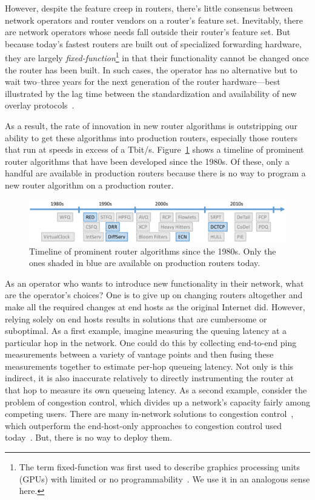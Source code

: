 However, despite the feature creep in routers, there's little consensus between
network operators and router vendors on a router's feature set. Inevitably,
there are network operators whose needs fall outside their router's feature
set. But because today's fastest routers are built out of specialized
forwarding hardware, they are largely {\em fixed-function}\footnote{The term fixed-function
was first used to describe graphics processing units (GPUs) with limited or no programmability~\cite{gpu_fixed}. We use it in an analogous sense here.} in that their
functionality cannot be changed once the router has been built. In such cases,
the operator has no alternative but to wait two--three years for the next
generation of the router hardware---best illustrated by the lag time between
the standardization and availability of new overlay protocols~\cite{vxlan,
nvgre}.

As a result, the rate of innovation in new router algorithms is outstripping
our ability to get these algorithms into production routers, especially those
routers that run at speeds in excess of a Tbit/s.
Figure~\ref{fig:router_algos} shows a timeline of prominent router algorithms
that have been developed since the 1980s. Of these, only a handful are
available in production routers because there is no way to program a new router
algorithm on a production router.

\begin{figure}
\centering
\includegraphics[width=\columnwidth]{router_alg_timeline.pdf}
\caption{Timeline of prominent router algorithms since the 1980s. Only the ones
shaded in blue are available on production routers today.}
\label{fig:router_algos}
\end{figure}

As an operator who wants to introduce new functionality in their network, what
are the operator's choices? One is to give up on changing routers altogether
and make all the required changes at end hosts as the original Internet did.
However, relying solely on end hosts results in solutions that are cumbersome
or suboptimal. As a first example, imagine measuring the queuing latency at a
particular hop in the network. One could do this by collecting end-to-end ping
measurements between a variety of vantage points and then fusing these
measurements together to estimate per-hop queueing latency. Not only is this
indirect, it is also inaccurate relatively to directly instrumenting the router
at that hop to measure its own queueing latency. As a second example, consider
the problem of congestion control, which divides up a network's capacity fairly
among competing users. There are many in-network solutions to congestion
control~\cite{xcp, rcp}, which outperform the end-host-only approaches to
congestion control used today~\cite{cubic, compound}. But, there is no way to
deploy them. 

